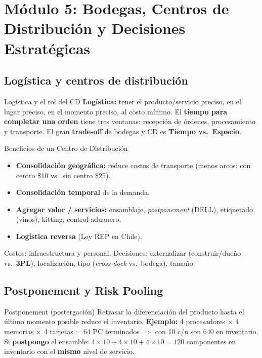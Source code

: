 \section{Módulo 5: Bodegas, Centros de Distribución y Decisiones Estratégicas}

\subsection{Logística y centros de distribución}

\begin{definicion}{Logística y el rol del CD}
\textbf{Logística:} tener el producto/servicio preciso, en el lugar preciso, en el momento preciso, al costo mínimo. El \textbf{tiempo para completar una orden} tiene tres ventanas: recepción de órdenes, procesamiento y transporte. El gran \textbf{trade-off} de bodegas y CD es \textbf{Tiempo vs.\ Espacio}.
\end{definicion}

\begin{definicion}{Beneficios de un Centro de Distribución}
\begin{itemize}[leftmargin=1.4em, itemsep=1pt]
  \item \textbf{Consolidación geográfica:} reduce costos de transporte (menos arcos: con centro \$10 vs.\ sin centro \$25).
  \item \textbf{Consolidación temporal} de la demanda.
  \item \textbf{Agregar valor / servicios:} ensamblaje, \textit{postponement} (DELL), etiquetado (vinos), kitting, control aduanero.
  \item \textbf{Logística reversa} (Ley REP en Chile).
\end{itemize}
Costos: infraestructura y personal. Decisiones: externalizar (construir/dueño vs.\ \textbf{3PL}), localización, tipo (\textit{cross-dock} vs.\ bodega), tamaño.
\end{definicion}

\subsection{Postponement y Risk Pooling}

\begin{definicion}{Postponement (postergación)}
Retrasar la diferenciación del producto hasta el último momento posible reduce el inventario. \textbf{Ejemplo:} 4 procesadores $\times$ 4 memorias $\times$ 4 tarjetas = 64 PC terminados $\Rightarrow$ con 10 c/u son 640 en inventario. Si \textbf{postpongo} el ensamble: $4\times10 + 4\times10 + 4\times10 = 120$ componentes en inventario con el \textbf{mismo} nivel de servicio.
\end{definicion}

